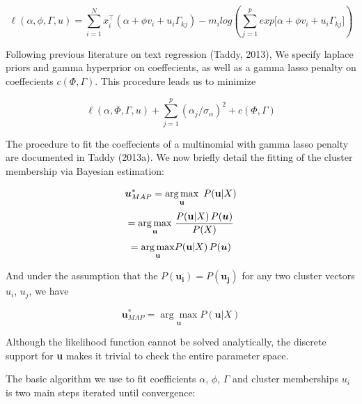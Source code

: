 \documentclass[12pt]{article}
\begin{document}
\begin{equation} 
\ell(\alpha,\phi,\Gamma,u) = \sum_{i = 1}^{N}{ x_i^\top (\alpha + \phi v_i + u_i \Gamma_{kj})} - m_i log(\sum_{j = 1}^{p}{exp{\big[ \alpha + \phi v_i + u_i \Gamma_{kj} \big]}})
\end{equation}

Following previous literature on text regression (Taddy, 2013), We specify laplace priors and gamma hyperprior on coeffecients, as well as a gamma lasso penalty on coeffecients $c(\Phi,\Gamma)$. This
procedure leads us to minimize

\begin{equation}
\ell(\alpha,\Phi,\Gamma,u) + \sum_{j=1}^{p}(\alpha_j/ \sigma_\alpha)^2 + c(\Phi,\Gamma) 
\end{equation}


The procedure to fit the coeffecients of a multinomial with gamma lasso penalty are documented in Taddy (2013a). We now briefly detail the fitting of the cluster membership via Bayesian estimation:

\begin{equation}
\boldsymbol{u}^{*}_{MAP}  = \underset{\mathbf{u}}{\arg\max} \, \, \, P( \mathbf{u} | X) \\
\end{equation}
\begin{equation}
= \underset{\mathbf{u}}{\arg\max} \, \, \frac{P( \mathbf{u} | X) \, P(\boldsymbol{u})}{P(X)}    \\
\end{equation}
\begin{equation}
= \underset{\mathbf{u}}{\arg\max} P( \mathbf{u} | X) \, P(\boldsymbol{u})  \\
\end{equation}

And under the assumption that the $P(\boldsymbol{u_i}) = P(\boldsymbol{u_j})$ for any two cluster vectors $u_i$, $u_j$, we have

\begin{equation}
\boldsymbol{u}^{*}_{MAP} = \underset{\mathbf{u}}{\arg\max} P( \mathbf{u} | X)
\end{equation}


Although the likelihood function cannot be solved analytically, the discrete support for \textbf{u} makes it trivial to check the entire parameter space.


 The basic algorithm we use to fit coefficients $\alpha$, $\phi$, $\Gamma$
and cluster memberships $u_i$ is two main steps iterated until
convergence:
\end{document}
